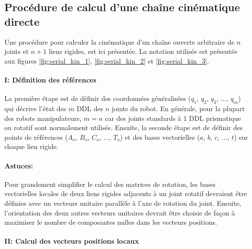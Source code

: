 \subsection{Procédure de calcul d'une chaîne cinématique directe}

Une procédure pour calculer la cinématique d'un chaîne ouverte arbitraire de $n$ joints et $n+1$ liens rigides, est ici présentée. La notation utilisée est présentée aux figures \ref{fig:serial_kin_1}, \ref{fig:serial_kin_2} et \ref{fig:serial_kin_3}. 

\paragraph{I: Définition des références}

La première étape est de définir des coordonnées généralisées ($q_1$, $q_2$, $q_2$, ..., $q_m$) qui décrive l'état des $m$ DDL des $n$ joints du robot. En générale, pour la plupart des robots manipulateurs, $m=n$ car des joints standards à 1 DDL prismatique ou rotatif sont normalement utilisés. Ensuite, la seconde étape est de définir des points de références ($A_o$, $B_o$, $C_o$, ..., $T_o$) et des bases vectorielles ($a$, $b$, $c$, ..., $t$) sur chaque lien rigide. 

\paragraph{Astuces:} Pour grandement simplifier le calcul des matrices de rotation, les bases vectorielles locales de deux liens rigides adjacents à un joint rotatif devraient être définies avec un vecteurs unitaire parallèle à l'axe de rotation du joint. Ensuite, l'orientation des deux autres vecteurs unitaires devrait être choisie de façon à maximiser le nombre de composantes nulles dans les vecteurs positions.

\paragraph{II: Calcul des vecteurs positions locaux}

